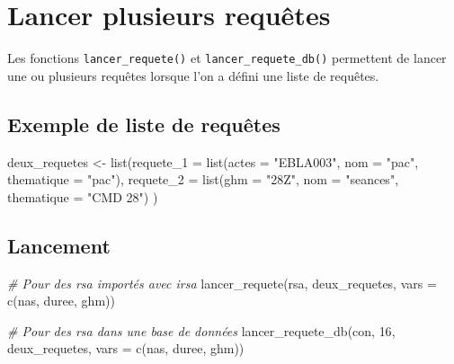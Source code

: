\documentclass[
]{book}
\newenvironment{Shaded}{\begin{snugshade}}{\end{snugshade}}
\newcommand{\AttributeTok}[1]{\textcolor[rgb]{0.77,0.63,0.00}{#1}}
\newcommand{\CommentTok}[1]{\textcolor[rgb]{0.56,0.35,0.01}{\textit{#1}}}
\newcommand{\DecValTok}[1]{\textcolor[rgb]{0.00,0.00,0.81}{#1}}
\newcommand{\FunctionTok}[1]{\textcolor[rgb]{0.00,0.00,0.00}{#1}}
\newcommand{\NormalTok}[1]{#1}
\newcommand{\OtherTok}[1]{\textcolor[rgb]{0.56,0.35,0.01}{#1}}
\newcommand{\StringTok}[1]{\textcolor[rgb]{0.31,0.60,0.02}{#1}}
\begin{document}
\hypertarget{lancer-plusieurs-requuxeates}{%
\section{Lancer plusieurs requêtes}\label{lancer-plusieurs-requuxeates}}

Les fonctions \texttt{lancer\_requete()} et \texttt{lancer\_requete\_db()} permettent de lancer une ou plusieurs requêtes lorsque l'on a défini une liste de requêtes.

\hypertarget{exemple-de-liste-de-requuxeates}{%
\subsection{Exemple de liste de requêtes}\label{exemple-de-liste-de-requuxeates}}

\begin{Shaded}
\begin{Highlighting}[]
\NormalTok{deux\_requetes }\OtherTok{\textless{}{-}} \FunctionTok{list}\NormalTok{(}\AttributeTok{requete\_1 =} \FunctionTok{list}\NormalTok{(}\AttributeTok{actes =} \StringTok{"EBLA003"}\NormalTok{, }\AttributeTok{nom =} \StringTok{"pac"}\NormalTok{, }\AttributeTok{thematique =} \StringTok{"pac"}\NormalTok{),}
                      \AttributeTok{requete\_2 =} \FunctionTok{list}\NormalTok{(}\AttributeTok{ghm =} \StringTok{"28Z"}\NormalTok{, }\AttributeTok{nom =} \StringTok{"seances"}\NormalTok{, }\AttributeTok{thematique =} \StringTok{"CMD 28"}\NormalTok{)}
\NormalTok{)}
\end{Highlighting}
\end{Shaded}

\hypertarget{lancement}{%
\subsection{Lancement}\label{lancement}}

\begin{Shaded}
\begin{Highlighting}[]
\CommentTok{\# Pour des rsa importés avec irsa}
\FunctionTok{lancer\_requete}\NormalTok{(rsa, deux\_requetes, }\AttributeTok{vars =} \FunctionTok{c}\NormalTok{(}\StringTok{\textquotesingle{}nas\textquotesingle{}}\NormalTok{, }\StringTok{\textquotesingle{}duree\textquotesingle{}}\NormalTok{, }\StringTok{\textquotesingle{}ghm\textquotesingle{}}\NormalTok{))}

\CommentTok{\# Pour des rsa dans une base de données}
\FunctionTok{lancer\_requete\_db}\NormalTok{(con, }\DecValTok{16}\NormalTok{, deux\_requetes, }\AttributeTok{vars =} \FunctionTok{c}\NormalTok{(}\StringTok{\textquotesingle{}nas\textquotesingle{}}\NormalTok{, }\StringTok{\textquotesingle{}duree\textquotesingle{}}\NormalTok{, }\StringTok{\textquotesingle{}ghm\textquotesingle{}}\NormalTok{))}
\end{Highlighting}
\end{Shaded}
\end{document}
